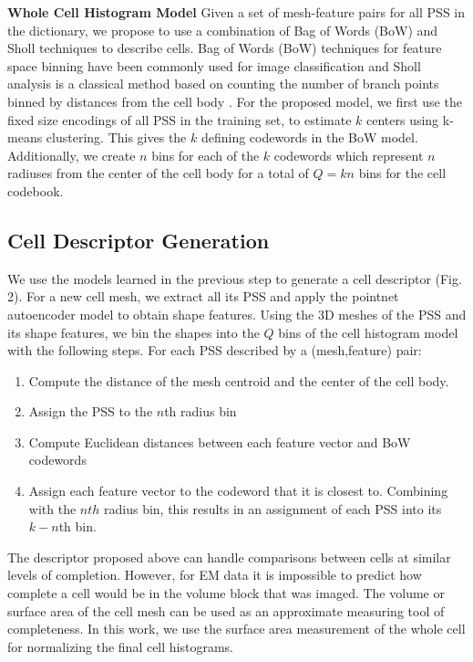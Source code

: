 \documentclass[runningheads]{llncs}
\begin{document}
\noindent \textbf{Whole Cell Histogram Model}
Given a set of mesh-feature pairs for all PSS in the dictionary, we propose to use a combination of Bag of Words (BoW) and Sholl techniques to describe cells. Bag of Words (BoW) techniques for feature space binning have been commonly used for image classification \cite{bow2005} and Sholl analysis is a classical method based on counting the number of branch points binned by distances from the cell body \cite{Sholl2015}. For the proposed model, we first use the fixed size encodings of all PSS in the training set, to estimate $k$ centers using k-means clustering. This gives the $k$ defining codewords in the BoW model. Additionally, we create $n$ bins for each of the $k$ codewords which represent $n$ radiuses from the center of the cell body for a total of $Q = kn$ bins for the cell codebook.

\subsection{\textbf{Cell Descriptor Generation }}
We use the models learned in the previous step to generate a cell descriptor (Fig. 2). 
For a new cell mesh, we extract all its PSS and apply the pointnet autoencoder model to obtain shape features. Using the 3D meshes of the PSS and its shape features, we bin the shapes into the $Q$ bins of the cell histogram model with the following steps. For each PSS described by a (mesh,feature) pair:
\begin{enumerate}
    \item Compute the distance of the mesh centroid and the center of the cell body. 
    \item Assign the PSS to the $n$th radius bin
    \item Compute Euclidean distances between each feature vector and BoW codewords 
    \item Assign each feature vector to the codeword that it is closest to. Combining with the $nth$ radius bin, this results in an assignment of each PSS into its $k-n$th bin.
\end{enumerate}
The descriptor proposed above can handle comparisons between cells at similar levels of completion. However, for EM data it is impossible to predict how complete a cell would be in the volume block that was imaged. The volume or surface area of the cell mesh can be used as an approximate measuring tool of completeness. In this work, we use the surface area measurement of the whole cell for normalizing the final cell histograms.
\end{document}
